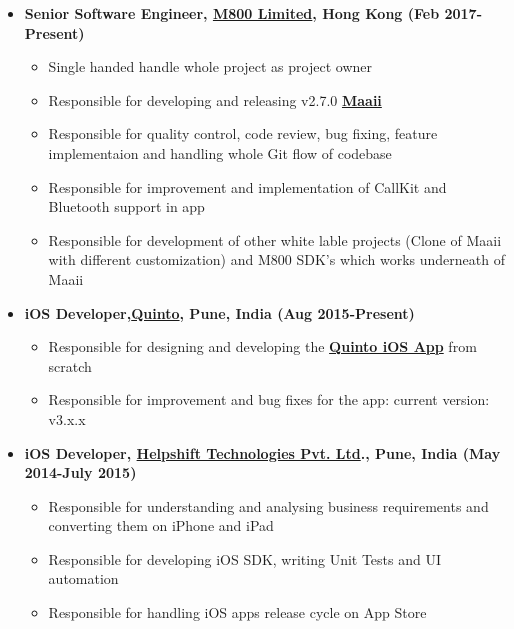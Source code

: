 \documentclass[letterpaper,11pt]{article}
\newcommand{\resitem}[1]{\item #1 \vspace{-2pt}}
\begin{document}
\begin{itemize}

\resitem {{\bfseries Senior Software Engineer, \href{http://www.m800.com} {M800 Limited}, Hong Kong (Feb 2017-Present)}}
		{ \footnotesize
		\begin{itemize}
			\resitem{Single handed handle whole project as project owner}
			\resitem{Responsible for developing and releasing v2.7.0  \href{https://itunes.apple.com/hk/app/id488051175}{\bfseries Maaii}}
			\resitem{Responsible for quality control, code review, bug fixing, feature implementaion and handling whole Git flow of codebase}
			\resitem{Responsible for improvement and implementation of CallKit and Bluetooth support in app }
			\resitem{Responsible for development of other white lable projects (Clone of Maaii with different customization) and M800 SDK's which works underneath of Maaii}
		\end{itemize}
		}
\resitem {{\bfseries iOS Developer,\href{http://quintoapp.com} {Quinto}, Pune, India (Aug 2015-Present)}}
		{ \footnotesize
		\begin{itemize}
			\resitem{Responsible for designing and developing the \href{https://itunes.apple.com/in/app/id912305961}{\bfseries Quinto iOS App} from scratch}
			\resitem{Responsible for improvement and bug fixes for the app: current version: v3.x.x}
		\end{itemize}
		}
\resitem {{\bfseries iOS Developer, \href{https://helpshift.com}{\bfseries Helpshift Technologies Pvt. Ltd}., Pune, India (May 2014-July 2015)}}
		{ \footnotesize
		\begin{itemize}
			\resitem{Responsible for understanding and analysing business requirements and converting them on iPhone and iPad}
			\resitem{Responsible for developing iOS SDK, writing Unit Tests and UI automation}
			\resitem{Responsible for handling iOS apps release cycle on App Store}
		\end{itemize}
		}
\end{itemize}  %
\end{document}

